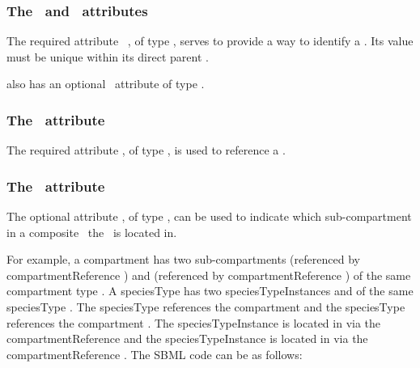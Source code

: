 \subsubsection{The \idAtt\ and \nameAtt\ attributes}
\label{def:SpeciesTypeInstance:idAndName}

The required attribute \idAtt\ , of type \SIdPT, serves to provide a way to identify a \speciesTypeInstance. Its value must be unique within its direct parent \speciesType. 

 also has an optional \nameAtt\ attribute of type \stringPT. 

\subsubsection{The \speciesTypeAtt\ attribute}
\label{def:SpeciesTypeInstance:speciesType}

The required attribute \speciesTypeAtt, of type \SIdRefPT, is used to reference a \speciesType. 

\subsubsection{The \compartmentReferenceAtt\ attribute}
\label{def:SpeciesTypeInstance:compartmentReference}

The optional attribute \compartmentReferenceAtt, of type \SIdRefPT, can be used to indicate which sub-compartment in a composite \compartment\ the \speciesTypeInstance\ is located in. 

For example, a compartment  has two sub-compartments  (referenced by compartmentReference ) and  (referenced by compartmentReference ) of the same compartment type . A speciesType  has two speciesTypeInstances  and  of the same speciesType . The speciesType  references the compartment  and the speciesType  references the compartment . The speciesTypeInstance  is located in  via the compartmentReference  and the speciesTypeInstance  is located in  via the compartmentReference . The SBML code can be as follows:

\label{example:SpeciesTypeInstance_compartmentReference}


